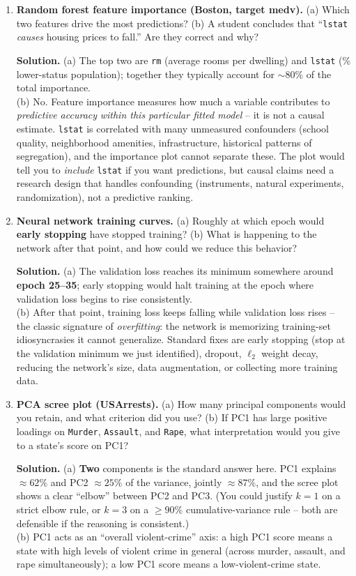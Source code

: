 \documentclass[11pt]{article}
\newcommand{\solution}[1]{%
  \par\medskip\noindent\textbf{Solution.} #1\par\medskip
}
\begin{document}
\begin{enumerate}[leftmargin=*]
\item \textbf{Random forest feature importance (Boston, target medv).} (a) Which two features drive the most predictions? (b) A student concludes that ``\texttt{lstat} \emph{causes} housing prices to fall.'' Are they correct and why?

\solution{(a) The top two are \texttt{rm} (average rooms per dwelling) and \texttt{lstat} (\% lower-status population); together they typically account for $\sim$80\% of the total importance.\\
(b) No. Feature importance measures how much a variable contributes to \emph{predictive accuracy} \emph{within this particular fitted model} -- it is not a causal estimate. \texttt{lstat} is correlated with many unmeasured confounders (school quality, neighborhood amenities, infrastructure, historical patterns of segregation), and the importance plot cannot separate these. The plot would tell you to \emph{include} \texttt{lstat} if you want predictions, but causal claims need a research design that handles confounding (instruments, natural experiments, randomization), not a predictive ranking.}

\item \textbf{Neural network training curves.} (a) Roughly at which epoch would \textbf{early stopping} have stopped training? (b) What is happening to the network after that point, and how could we reduce this behavior?

\solution{(a) The validation loss reaches its minimum somewhere around \textbf{epoch 25--35}; early stopping would halt training at the epoch where validation loss begins to rise consistently.\\
(b) After that point, training loss keeps falling while validation loss rises -- the classic signature of \emph{overfitting}: the network is memorizing training-set idiosyncrasies it cannot generalize. Standard fixes are early stopping (stop at the validation minimum we just identified), dropout, $\ell_2$ weight decay, reducing the network's size, data augmentation, or collecting more training data.}

\item \textbf{PCA scree plot (USArrests).} (a) How many principal components would you retain, and what criterion did you use? (b) If PC1 has large positive loadings on \texttt{Murder}, \texttt{Assault}, and \texttt{Rape}, what interpretation would you give to a state's score on PC1?

\solution{(a) \textbf{Two} components is the standard answer here. PC1 explains $\approx 62\%$ and PC2 $\approx 25\%$ of the variance, jointly $\approx 87\%$, and the scree plot shows a clear ``elbow'' between PC2 and PC3. (You could justify $k=1$ on a strict elbow rule, or $k=3$ on a $\geq 90\%$ cumulative-variance rule -- both are defensible if the reasoning is consistent.)\\
(b) PC1 acts as an ``overall violent-crime'' axis: a high PC1 score means a state with high levels of violent crime in general (across murder, assault, and rape simultaneously); a low PC1 score means a low-violent-crime state.}


\end{enumerate}
\end{document}

